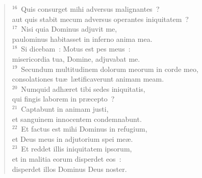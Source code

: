 \begin{flushleft}
\begin{verse}
${}^{16}$~Quis consurget mihi adversus malignantes~?\\ aut quis stabit mecum adversus operantes iniquitatem~?\\
${}^{17}$~Nisi quia Dominus adjuvit me,\\ paulominus habitasset in inferno anima mea.\\
${}^{18}$~Si dicebam~: Motus est pes meus~:\\ misericordia tua, Domine, adjuvabat me.\\
${}^{19}$~Secundum multitudinem dolorum meorum in corde meo,\\ consolationes tu\ae\ l\ae tificaverunt animam meam.\\
${}^{20}$~Numquid adh\ae ret tibi sedes iniquitatis,\\ qui fingis laborem in pr\ae cepto~?\\
${}^{21}$~Captabunt in animam justi,\\ et sanguinem innocentem condemnabunt.\\
${}^{22}$~Et factus est mihi Dominus in refugium,\\ et Deus meus in adjutorium spei me\ae .\\
${}^{23}$~Et reddet illis iniquitatem ipsorum,\\ et in malitia eorum disperdet eos~:\\ disperdet illos Dominus Deus noster.\end{verse}\end{flushleft}


